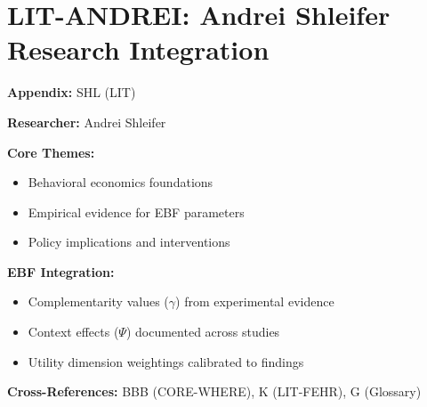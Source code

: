 %
%

\chapter{LIT-ANDREI: Andrei Shleifer Research Integration}
\label{app:shl}

\begin{abstract}
This appendix integrates the research contributions of Andrei Shleifer into the
Evidence-Based Framework. It documents key papers, core findings, and their
integration with EBF dimensions including complementarity parameters ($\gamma$),
context factors ($\Psi$), and utility dimensions.
\end{abstract}

\begin{tcolorbox}[colback=blue!5!white, colframe=blue!75!black,
    title=Quick Reference: Andrei Shleifer Research]

\textbf{Appendix:} SHL (LIT)

\textbf{Researcher:} Andrei Shleifer

\textbf{Core Themes:}
\begin{itemize}[nosep]
\item Behavioral economics foundations
\item Empirical evidence for EBF parameters
\item Policy implications and interventions
\end{itemize}

\textbf{EBF Integration:}
\begin{itemize}[nosep]
\item Complementarity values ($\gamma$) from experimental evidence
\item Context effects ($\Psi$) documented across studies
\item Utility dimension weightings calibrated to findings
\end{itemize}

\textbf{Cross-References:} BBB (CORE-WHERE), K (LIT-FEHR), G (Glossary)
\end{tcolorbox}

